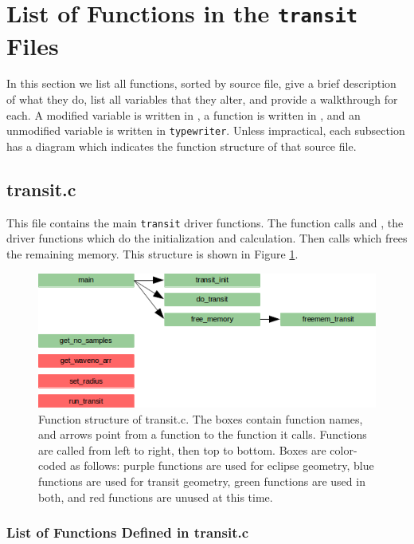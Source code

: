 \documentclass[letterpaper,12pt]{article}
\begin{document}
\newpage
\section{List of Functions in the \texttt{transit} Files}
\label{sec:functions}
In this section we list all functions, sorted by source file, give a brief description of what they do, list all variables that they alter, and provide a walkthrough for each. A modified variable is written in , a function is written in , and an unmodified variable is written in {\tt typewriter}. Unless impractical, each subsection has a diagram which indicates the function structure of that source file.

\subsection{transit.c}
This file contains the main {\tt transit} driver functions. The  function calls  and , the driver functions which do the initialization and calculation. Then  calls  which frees the remaining memory. This structure is shown in Figure \ref{fig:transitc}.

\begin{figure}
\includegraphics{fig/transitc}
\caption{Function structure of transit.c. The boxes contain function names, and arrows point from a function to the function it calls. Functions are called from left to right, then top to bottom. Boxes are color-coded as follows:  purple functions are used for eclipse geometry, blue functions are used for transit geometry, green functions are used in both, and red functions are unused at this time.}
\label{fig:transitc}
\end{figure}

\subsubsection{List of Functions Defined in transit.c}
 \newline
\end{document}
